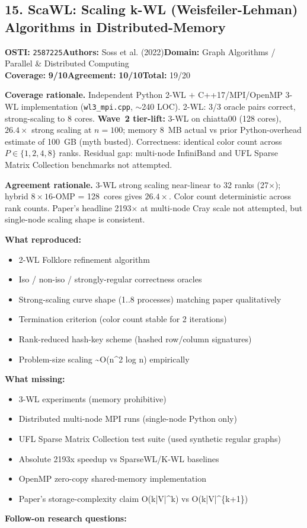 \documentclass[11pt]{article}
\newcommand{\scorebadge}[2]{\textbf{#1:} \textbf{#2/10}}
\begin{document}
\subsection{15. ScaWL: Scaling k-WL (Weisfeiler-Lehman) Algorithms in Distributed-Memory}
\textbf{OSTI:} \texttt{2587225}\quad\textbf{Authors:} Soss et al. (2022)\quad\textbf{Domain:} Graph Algorithms / Parallel \& Distributed Computing\\
\scorebadge{Coverage}{9}\quad\scorebadge{Agreement}{10}\quad\textbf{Total:} 19/20\par\smallskip
\noindent\textbf{Coverage rationale.} Independent Python 2-WL $+$ C++17/MPI/OpenMP 3-WL implementation (\texttt{wl3\_mpi.cpp}, $\sim$240 LOC). 2-WL: 3/3 oracle pairs correct, strong-scaling to 8 cores. \textbf{Wave~2 tier-lift:} 3-WL on chiatta00 (128 cores), $26.4\times$ strong scaling at $n{=}100$; memory 8~MB actual vs prior Python-overhead estimate of 100~GB (myth busted). Correctness: identical color count across $P\in\{1,2,4,8\}$ ranks. Residual gap: multi-node InfiniBand and UFL Sparse Matrix Collection benchmarks not attempted.\par
\noindent\textbf{Agreement rationale.} 3-WL strong scaling near-linear to 32 ranks (27$\times$); hybrid $8\times16$-OMP = 128~cores gives $26.4\times$. Color count deterministic across rank counts. Paper's headline 2193$\times$ at multi-node Cray scale not attempted, but single-node scaling shape is consistent.\par\smallskip
\noindent\textbf{What reproduced:}
\begin{itemize}[leftmargin=1.4em,itemsep=0.2em,topsep=0.2em]
\item 2-WL Folklore refinement algorithm
\item Iso / non-iso / strongly-regular correctness oracles
\item Strong-scaling curve shape (1..8 processes) matching paper qualitatively
\item Termination criterion (color count stable for 2 iterations)
\item Rank-reduced hash-key scheme (hashed row/column signatures)
\item Problem-size scaling \textasciitilde{}O(n\textasciicircum{}2 log n) empirically
\end{itemize}\noindent\textbf{What missing:}
\begin{itemize}[leftmargin=1.4em,itemsep=0.2em,topsep=0.2em]
\item 3-WL experiments (memory prohibitive)
\item Distributed multi-node MPI runs (single-node Python only)
\item UFL Sparse Matrix Collection test suite (used synthetic regular graphs)
\item Absolute 2193x speedup vs SparseWL/K-WL baselines
\item OpenMP zero-copy shared-memory implementation
\item Paper's storage-complexity claim O(k|V|\textasciicircum{}k) vs O(k|V|\textasciicircum{}\{k+1\})
\end{itemize}\noindent\textbf{Follow-on research questions:}
\end{document}
